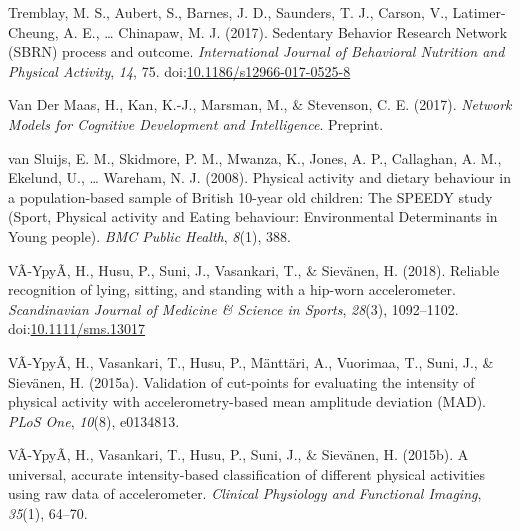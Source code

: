 \documentclass[english,floatsintext,]{apa6}
\theoremstyle{definition}
\theoremstyle{definition}
\theoremstyle{definition}
\theoremstyle{remark}
\begin{document}
\hypertarget{ref-tremblaySedentaryBehaviorResearch2017}{}
Tremblay, M. S., Aubert, S., Barnes, J. D., Saunders, T. J., Carson, V.,
Latimer-Cheung, A. E., \ldots{} Chinapaw, M. J. (2017). Sedentary
Behavior Research Network (SBRN) process and outcome.
\emph{International Journal of Behavioral Nutrition and Physical
Activity}, \emph{14}, 75.
doi:\href{https://doi.org/10.1186/s12966-017-0525-8}{10.1186/s12966-017-0525-8}

\hypertarget{ref-vandermaasNetworkModelsCognitive2017}{}
Van Der Maas, H., Kan, K.-J., Marsman, M., \& Stevenson, C. E. (2017).
\emph{Network Models for Cognitive Development and Intelligence}.
Preprint.

\hypertarget{ref-vansluijsPhysicalActivityDietary2008}{}
van Sluijs, E. M., Skidmore, P. M., Mwanza, K., Jones, A. P., Callaghan,
A. M., Ekelund, U., \ldots{} Wareham, N. J. (2008). Physical activity
and dietary behaviour in a population-based sample of British 10-year
old children: The SPEEDY study (Sport, Physical activity and Eating
behaviour: Environmental Determinants in Young people). \emph{BMC Public
Health}, \emph{8}(1), 388.

\hypertarget{ref-vaha-ypyaReliableRecognitionLying2018}{}
VÃ\textcurrency-YpyÃ\textcurrency, H., Husu, P., Suni,
J., Vasankari, T., \& Sievänen, H. (2018). Reliable recognition of
lying, sitting, and standing with a hip-worn accelerometer.
\emph{Scandinavian Journal of Medicine \& Science in Sports},
\emph{28}(3), 1092--1102.
doi:\href{https://doi.org/10.1111/sms.13017}{10.1111/sms.13017}

\hypertarget{ref-vaha-ypyaValidationCutpointsEvaluating2015}{}
VÃ\textcurrency-YpyÃ\textcurrency, H., Vasankari, T.,
Husu, P., Mänttäri, A., Vuorimaa, T., Suni, J., \& Sievänen, H. (2015a).
Validation of cut-points for evaluating the intensity of physical
activity with accelerometry-based mean amplitude deviation (MAD).
\emph{PLoS One}, \emph{10}(8), e0134813.

\hypertarget{ref-vaha-ypyaUniversalAccurateIntensitybased2015}{}
VÃ\textcurrency-YpyÃ\textcurrency, H., Vasankari, T.,
Husu, P., Suni, J., \& Sievänen, H. (2015b). A universal, accurate
intensity-based classification of different physical activities using
raw data of accelerometer. \emph{Clinical Physiology and Functional
Imaging}, \emph{35}(1), 64--70.

\endgroup
\end{document}

